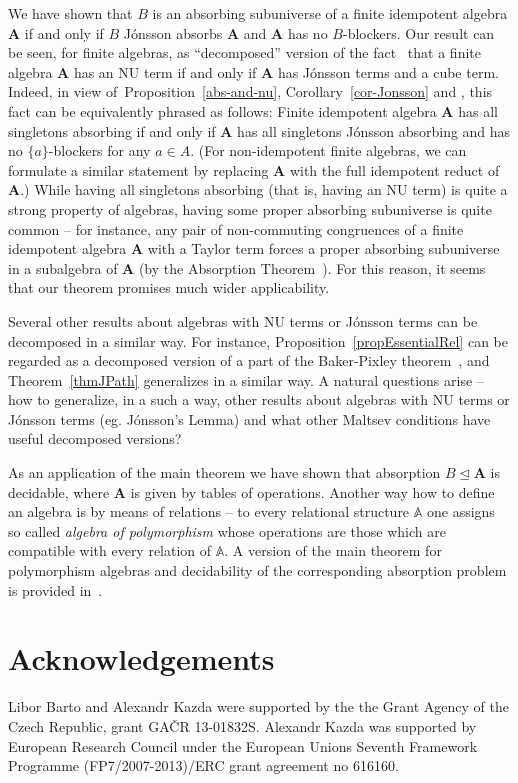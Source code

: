 \documentclass{amsart}
\theoremstyle{plain}
\theoremstyle{definition}
\begin{document}
We have shown that $B$ is an absorbing subuniverse of a finite idempotent algebra ${{\mathbf{A}}}$ if and only if $B$ J\'onsson absorbs ${{\mathbf{A}}}$ and ${{\mathbf{A}}}$ has no $B$-blockers. Our result can be seen, for finite algebras, as  ``decomposed'' version of the fact~\cite{BIMMVW,MM08b} that a finite algebra ${{\mathbf{A}}}$ has an NU term if and only if ${{\mathbf{A}}}$ has J\'onsson terms and a cube term. Indeed, in view of~Proposition~\ref{abs-and-nu}, Corollary~\ref{cor-Jonsson} and \cite[Theorem~3.4]{markovic-maroti-mckenzie-blockers}, this fact can be equivalently phrased as follows:
Finite idempotent algebra ${{\mathbf{A}}}$ has all singletons absorbing if and only if ${{\mathbf{A}}}$ has all singletons J\'onsson absorbing and has no $\{a\}$-blockers for any $a \in A$.  (For non-idempotent finite algebras, we can formulate a similar statement by replacing ${{\mathbf{A}}}$ with the full idempotent reduct of ${{\mathbf{A}}}$.) While having all singletons absorbing (that is, having an NU term) is quite a strong property of algebras, having some proper absorbing subuniverse is quite common -- for instance, any pair of non-commuting congruences of a finite idempotent algebra ${{\mathbf{A}}}$ with a Taylor term forces a proper absorbing subuniverse in a subalgebra of ${{\mathbf{A}}}$ (by the Absorption Theorem~\cite{barto-kozik-cyclic-terms-and-csp}). For this reason, it seems that our theorem promises much wider applicability. 

Several other results about algebras with NU terms or J\'onsson terms can be decomposed in a similar way. For instance,
Proposition~\ref{propEssentialRel} can be regarded as a decomposed version of a part of the Baker-Pixley theorem~\cite{BP75}, and Theorem~\ref{thmJPath} generalizes \cite[Proposition~5.7]{matt-complexity-maltsev-conditions} in a similar way. A natural questions arise -- how to generalize, in a such a way, other results about algebras with NU terms or J\'onsson terms (eg. J\'onsson's Lemma) and what other Maltsev conditions have useful decomposed versions? 

As an application of the main theorem we have shown that absorption $B \operatorname{\trianglelefteq} {{\mathbf{A}}}$ is decidable, where ${{\mathbf{A}}}$ is given by tables of operations. Another way how to define an algebra is by means of relations -- to every relational structure ${\mathbb{{A}}}$ one assigns so called \emph{algebra of polymorphism} whose operations are those which are compatible with every relation of ${\mathbb{{A}}}$. A version of the main theorem for polymorphism algebras and decidability of the corresponding absorption problem is provided in~\cite{barto-bulin-absorption}. 

\section*{Acknowledgements}
Libor Barto and Alexandr Kazda were supported by the the Grant Agency of the Czech Republic, grant GA\v CR
13-01832S. Alexandr Kazda was supported by European Research Council under the
European Unions Seventh Framework Programme (FP7/2007-2013)/ERC grant agreement
no 616160.



\end{document}
